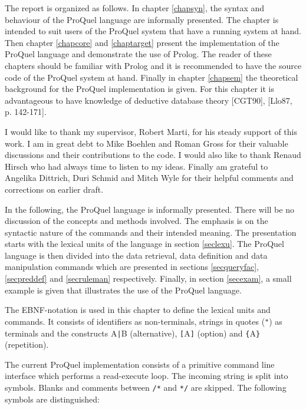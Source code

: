 The report is organized as follows. In chapter \ref{chapsyn}, the syntax and behaviour of the
ProQuel language are informally presented. The chapter is intended to suit users of the ProQuel
system that have a running system at hand. Then chapter \ref{chapcore} and \ref{chaptarget} 
present the implementation of the ProQuel language and demonstrate the use of Prolog. The reader 
of these chapters should be familiar with Prolog and it is recommended to have the source code 
of the ProQuel system at hand. Finally in chapter \ref{chapsem} the theoretical background 
for the ProQuel implementation is given. For this chapter it is advantageous to have knowledge
of deductive database theory [CGT90], [Llo87, p. 142-171].

I would like to thank my supervisor, Robert Marti, for his steady support of this work. I am in 
great debt to Mike Boehlen and Roman Gross for their valuable discussions and their contributions
to the code. I would also like to thank Renaud Hirsch who had always time to 
listen to my ideas. Finally am grateful to Angelika Dittrich, Duri Schmid and Mitch Wyle for 
their helpful comments and corrections on earlier draft.

\label{chapsyn}
In the following, the ProQuel language is informally presented. There will be no discussion of the
concepts and methods involved. The emphasis is on the syntactic nature of the commands and their
intended meaning. The presentation starts with the lexical units of the language in section 
\ref{seclexu}. The ProQuel language is then divided into the data retrieval, data definition
and data manipulation commands which are presented in sections \ref{secqueryfac}, \ref{secpreddef} 
and \ref{secruleman} respectively. Finally, in section \ref{secexam}, a small example is given that
illustrates the use of the ProQuel language.

The EBNF-notation is used in this chapter to define the lexical units and commands. It consists 
of identifiers as non-terminals, strings in quotes (\verb/"/) as terminals and the constructs 
A\verb/|/B (alternative), \verb/[/A\verb/]/ (option) and \verb/{/A\verb/}/ (repetition).

\label{seclexu}
The current ProQuel implementation consists of a primitive command line interface which performs
a read-execute loop. The incoming string is split into symbols. Blanks and comments between 
\verb./*. and \verb.*/. are skipped. The following symbols are distinguished:

